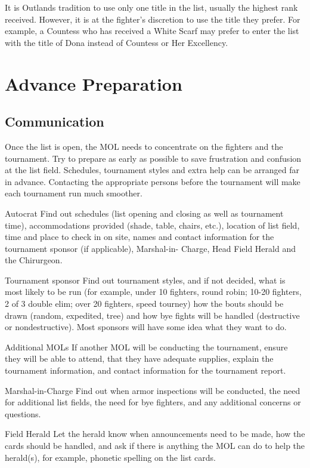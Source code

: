 \documentclass{article}
\begin{document}
It is Outlands tradition to use only one title in the list, usually the highest rank received. However, it is at
the fighter’s discretion to use the title they prefer. For example, a Countess who has received a White
Scarf may prefer to enter the list with the title of Dona instead of Countess or Her Excellency.

\section{Advance Preparation}
\subsection{Communication}

Once the list is open, the MOL needs to concentrate on the fighters and the tournament. Try to prepare as
early as possible to save frustration and confusion at the list field. Schedules, tournament styles and extra
help can be arranged far in advance. Contacting the appropriate persons before the tournament will make
each tournament run much smoother.

Autocrat Find out schedules (list opening and closing as well as tournament
time), accommodations provided (shade, table, chairs, etc.), location
of list field, time and place to check in on site, names and contact
information for the tournament sponsor (if applicable), Marshal-in-
Charge, Head Field Herald and the Chirurgeon.

Tournament sponsor Find out tournament styles, and if not decided, what is most likely to
be run (for example, under 10 fighters, round robin; 10-20 fighters, 2
of 3 double elim; over 20 fighters, speed tourney) how the bouts
should be drawn (random, expedited, tree) and how bye fights will
be handled (destructive or nondestructive). Most sponsors will have
some idea what they want to do.

Additional MOLs If another MOL will be conducting the tournament, ensure they will
be able to attend, that they have adequate supplies, explain the
tournament information, and contact information for the tournament
report.

Marshal-in-Charge Find out when armor inspections will be conducted, the need for
additional list fields, the need for bye fighters, and any additional
concerns or questions.

Field Herald Let the herald know when announcements need to be made, how the
cards should be handled, and ask if there is anything the MOL can
do to help the herald(s), for example, phonetic spelling on the list
cards.
\end{document}
